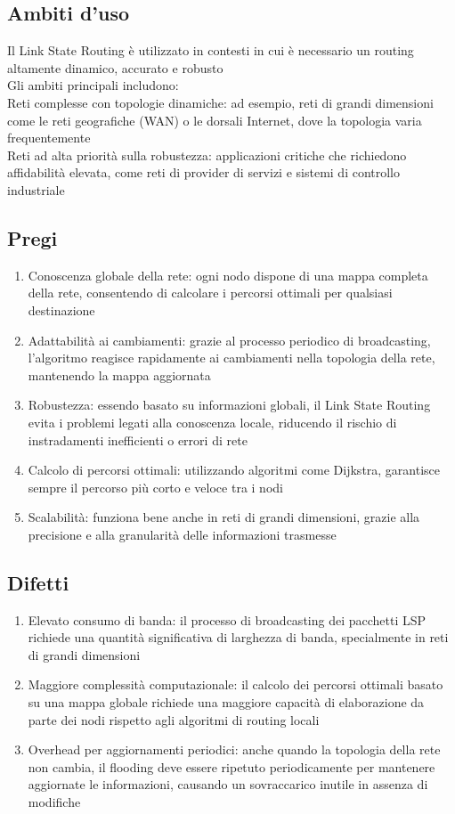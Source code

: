 \documentclass[10pt,oneside,a4paper]{article}
\begin{document}
\subsection{Ambiti d’uso}
Il Link State Routing è utilizzato in contesti in cui è necessario un routing altamente dinamico, accurato e robusto\\
Gli ambiti principali includono:\\
Reti complesse con topologie dinamiche: ad esempio, reti di grandi dimensioni come le reti geografiche (WAN) o le dorsali Internet, dove la topologia varia frequentemente\\
Reti ad alta priorità sulla robustezza: applicazioni critiche che richiedono affidabilità elevata, come reti di provider di servizi e sistemi di controllo industriale
\subsection{Pregi}
\begin{enumerate}
\item Conoscenza globale della rete: ogni nodo dispone di una mappa completa della rete, consentendo di calcolare i percorsi ottimali per qualsiasi destinazione
\item Adattabilità ai cambiamenti: grazie al processo periodico di broadcasting, l’algoritmo reagisce rapidamente ai cambiamenti nella topologia della rete, mantenendo la mappa aggiornata
\item Robustezza: essendo basato su informazioni globali, il Link State Routing evita i problemi legati alla conoscenza locale, riducendo il rischio di instradamenti inefficienti o errori di rete
\item Calcolo di percorsi ottimali: utilizzando algoritmi come Dijkstra, garantisce sempre il percorso più corto e veloce tra i nodi
\item Scalabilità: funziona bene anche in reti di grandi dimensioni, grazie alla precisione e alla granularità delle informazioni trasmesse
\end{enumerate}
\subsection{Difetti}
\begin{enumerate}
\item Elevato consumo di banda: il processo di broadcasting dei pacchetti LSP richiede una quantità significativa di larghezza di banda, specialmente in reti di grandi dimensioni
\item Maggiore complessità computazionale: il calcolo dei percorsi ottimali basato su una mappa globale richiede una maggiore capacità di elaborazione da parte dei nodi rispetto agli algoritmi di routing locali
\item Overhead per aggiornamenti periodici: anche quando la topologia della rete non cambia, il flooding deve essere ripetuto periodicamente per mantenere aggiornate le informazioni, causando un sovraccarico inutile in assenza di modifiche
\end{enumerate}
\end{document}
